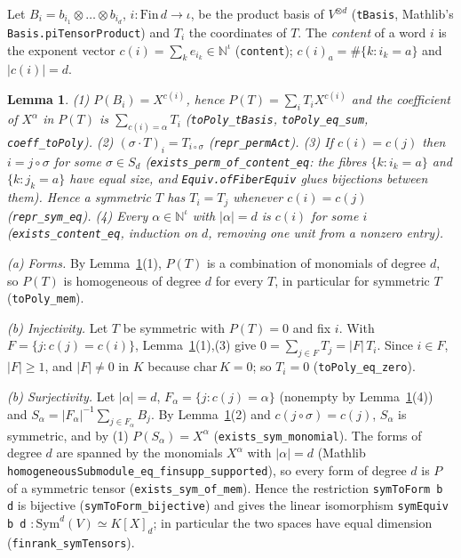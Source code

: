 \documentclass[11pt]{article}
\newtheorem{lemma}[theorem]{Lemma}
\theoremstyle{definition}
\newcommand{\lean}[1]{\texttt{#1}}
\begin{document}
Let $B_i=b_{i_1}\otimes\dots\otimes b_{i_d}$, $i:\mathrm{Fin}\,d\to\iota$, be the product basis of
$V^{\otimes d}$ (\lean{tBasis}, Mathlib's \lean{Basis.piTensorProduct}) and $T_i$ the coordinates of
$T$. The \emph{content} of a word $i$ is the exponent vector $c(i)=\sum_k e_{i_k}\in\mathbb N^\iota$
(\lean{content}); $c(i)_a=\#\{k: i_k=a\}$ and $|c(i)|=d$.

\begin{lemma}\label{lem:coord}
(1) $P(B_i)=X^{c(i)}$, hence $P(T)=\sum_i T_i X^{c(i)}$ and the coefficient of $X^\alpha$ in $P(T)$
is $\sum_{c(i)=\alpha}T_i$ (\lean{toPoly\_tBasis}, \lean{toPoly\_eq\_sum}, \lean{coeff\_toPoly}).
(2) $(\sigma\cdot T)_i=T_{i\circ\sigma}$ (\lean{repr\_permAct}).
(3) If $c(i)=c(j)$ then $i=j\circ\sigma$ for some $\sigma\in S_d$ (\lean{exists\_perm\_of\_content\_eq}:
the fibres $\{k:i_k=a\}$ and $\{k:j_k=a\}$ have equal size, and \lean{Equiv.ofFiberEquiv} glues
bijections between them). Hence a symmetric $T$ has $T_i=T_j$ whenever $c(i)=c(j)$
(\lean{repr\_sym\_eq}).
(4) Every $\alpha\in\mathbb N^\iota$ with $|\alpha|=d$ is $c(i)$ for some $i$
(\lean{exists\_content\_eq}, induction on $d$, removing one unit from a nonzero entry).
\end{lemma}

\emph{(a) Forms.} By Lemma~\ref{lem:coord}(1), $P(T)$ is a combination of monomials of degree
$d$, so $P(T)$ is homogeneous of degree $d$ for every $T$, in particular for symmetric $T$
(\lean{toPoly\_mem}).

\emph{(b) Injectivity.} Let $T$ be symmetric with $P(T)=0$ and fix $i$. With $F=\{j:c(j)=c(i)\}$,
Lemma~\ref{lem:coord}(1),(3) give $0=\sum_{j\in F}T_j=|F|\,T_i$. Since $i\in F$, $|F|\ge1$, and
$|F|\neq0$ in $K$ because $\mathrm{char}\,K=0$; so $T_i=0$ (\lean{toPoly\_eq\_zero}).

\emph{(b) Surjectivity.} Let $|\alpha|=d$, $F_\alpha=\{j:c(j)=\alpha\}$ (nonempty by
Lemma~\ref{lem:coord}(4)) and $S_\alpha=|F_\alpha|^{-1}\sum_{j\in F_\alpha}B_j$. By
Lemma~\ref{lem:coord}(2) and $c(j\circ\sigma)=c(j)$, $S_\alpha$ is symmetric, and by (1)
$P(S_\alpha)=X^\alpha$ (\lean{exists\_sym\_monomial}). The forms of degree $d$ are spanned by the
monomials $X^\alpha$ with $|\alpha|=d$ (Mathlib \lean{homogeneousSubmodule\_eq\_finsupp\_supported}),
so every form of degree $d$ is $P$ of a symmetric tensor (\lean{exists\_sym\_of\_mem}). Hence the
restriction \lean{symToForm b d} is bijective (\lean{symToForm\_bijective}) and gives the linear
isomorphism \lean{symEquiv b d} $:\mathrm{Sym}^d(V)\simeq K[X]_d$; in particular the two spaces have
equal dimension (\lean{finrank\_symTensors}).
\end{document}
